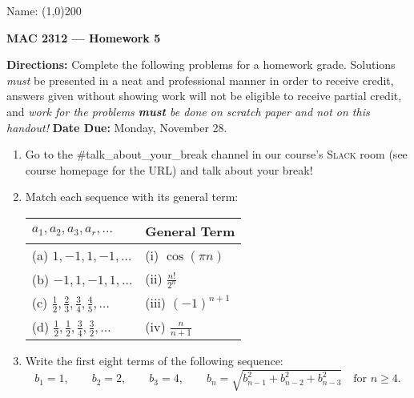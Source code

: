 \documentclass[12 pt]{article}
\begin{document}
\begin{flushright}Name: \line(1,0){200}\end{flushright}
\begin{center}
\Large{\textbf{MAC 2312 --- Homework 5}}
\end{center}
\textbf{Directions:} Complete the following problems for a homework grade. Solutions \textit{must} be presented in a neat and professional manner in order to receive credit, answers given without showing work will not be eligible to receive partial credit, and \textit{work for the problems \textbf{must} be done on scratch paper and not on this handout!} \textbf{Date Due:} Monday, November 28.
\begin{enumerate}[leftmargin=0in, rightmargin=-0.25in]
	\item Go to the \#talk\_about\_your\_break channel in our course's \textsc{Slack} room (see course homepage for the URL) and talk about your break!
	\item Match each sequence with its general term:
	\vspace{-4.5mm}
	\begin{center}
		\renewcommand{\arraystretch}{1.5}
		\begin{tabular}{l | l}
			$a_1,a_2,a_3,a_r,\ldots$ & General Term \\
			\hline
			(a) $1,-1,1,-1,\ldots$ &
				(i) $\cos(\pi n)$ \\[3mm]
			(b) $-1,1,-1,1,\ldots$ &
				(ii) $\frac{n!}{2^n}$\\[4.5mm]
			(c) $\frac{1}{2},\frac{2}{3},\frac{3}{4},\frac{4}{5},\ldots$ &
				(iii) $(-1)^{n+1}$\\[6mm]
			(d) $\frac{1}{2}, \frac{1}{2}, \frac{3}{4}, \frac{3}{2},\ldots$ & 
				(iv) $\frac{n}{n+1}$
		\end{tabular}
	\end{center}
	
	\item Write the first eight terms of the following sequence:
		$$b_1 = 1,\quad\quad b_2 = 2,\quad\quad b_3 = 4,\quad\quad b_n=\sqrt{b_{n-1}^2+b_{n-2}^2+b_{n-3}^2}\quad\text{for }n\geq 4.$$
		

\end{enumerate}
\end{document}
